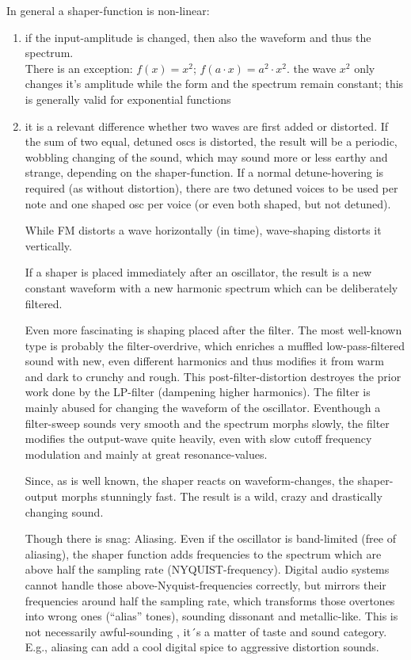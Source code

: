 In general a shaper-function is non-linear:
\begin{enumerate}
	\item if the input-amplitude is changed, then also the waveform and thus the spectrum.\\
	There is an exception: $f(x)=x^2$; $f(a \cdot x) = a^2 \cdot x^2$. the wave $x^2$ only changes it's amplitude while the form and the spectrum remain constant; this is generally valid for exponential functions
	\item it is a relevant difference whether two waves are first added or distorted. If the sum of two equal, detuned oscs is distorted, the result will be a periodic, wobbling changing of the sound, which may sound more or less earthy and strange, depending on the shaper-function. If a normal detune-hovering is required (as without distortion), there are two detuned voices to be used per note and one shaped osc per voice (or even both shaped, but not detuned).
	
	While FM distorts a wave horizontally (in time), wave-shaping distorts it vertically.
	
	If a shaper is placed immediately after an oscillator, the result is a new constant waveform with a new harmonic spectrum which can be deliberately filtered.
	
	Even more fascinating is shaping placed after the filter. The most well-known type is probably the filter-overdrive, which enriches a muffled low-pass-filtered sound with new, even different harmonics and thus modifies it from warm and dark to crunchy and rough. This post-filter-distortion destroyes the prior work done by the LP-filter (dampening higher harmonics). The filter is mainly abused for changing the waveform of the oscillator. Eventhough a filter-sweep sounds very smooth and the spectrum morphs slowly, the filter modifies the output-wave quite heavily, even with slow cutoff frequency modulation and mainly at great resonance-values.
	
	Since, as is well known, the shaper reacts on waveform-changes, the shaper-output morphs stunningly fast. The result is a wild, crazy and drastically changing sound.
	
	Though there is snag: Aliasing. Even if the oscillator is band-limited (free of aliasing), the shaper function adds frequencies to the spectrum which are above half the sampling rate (NYQUIST-frequency). Digital audio systems cannot handle those above-Nyquist-frequencies correctly, but mirrors their frequencies around half the sampling rate, which transforms those overtones into wrong ones (``alias'' tones), sounding dissonant and metallic-like. This is not necessarily awful-sounding , it´s a matter of taste and sound category. E.g., aliasing can add a cool digital spice to aggressive distortion sounds.
\end{enumerate}
